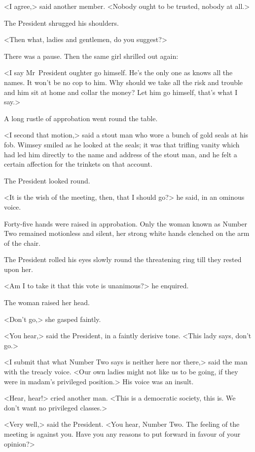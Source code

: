 <I agree,> said another member. <Nobody ought to be trusted, nobody at all.>

The President shrugged his shoulders.

<Then what, ladies and gentlemen, do you suggest?>

There was a pause. Then the same girl shrilled out again:

<I say Mr~President oughter go himself. He's the only one as knows all the names. It won't be no cop to him. Why should we take all the risk and trouble and him sit at home and collar the money? Let him go himself, that's what I say.>

A long rustle of approbation went round the table.

<I second that motion,> said a stout man who wore a bunch of gold seals at his fob. Wimsey smiled as he looked at the seals; it was that trifling vanity which had led him directly to the name and address of the stout man, and he felt a certain affection for the trinkets on that account.

The President looked round.

<It is the wish of the meeting, then, that I should go?> he said, in an ominous voice.

Forty-five hands were raised in approbation. Only the woman known as Number Two remained motionless and silent, her strong white hands clenched on the arm of the chair.

The President rolled his eyes slowly round the threatening ring till they rested upon her.

<Am I to take it that this vote is unanimous?> he enquired.

The woman raised her head.

<Don't go,> she gasped faintly.

<You hear,> said the President, in a faintly derisive tone. <This lady says, don't go.>

<I submit that what Number Two says is neither here nor there,> said the man with the treacly voice. <Our own ladies might not like us to be going, if they were in madam's privileged position.> His voice was an insult.

<Hear, hear!> cried another man. <This is a democratic society, this is. We don't want no privileged classes.>

<Very well,> said the President. <You hear, Number Two. The feeling of the meeting is against you. Have you any reasons to put forward in favour of your opinion?>

